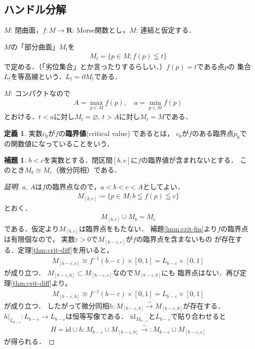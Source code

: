 \documentclass[11pt, a4paper, dvipdfmx]{jsarticle}
\theoremstyle{definition}
\newcommand{\rr}{\mathbf{R}}
\newcommand{\p}{\partial}
\newcommand{\e}{\varepsilon} %
\newcommand{\emp}{\varnothing}
\newcommand{\mapres}[2]{\left. #1 \right|_{#2}}
\newcommand{\id}{\mathrm{id}}
\theoremstyle{mystyle}
\newtheorem{DFN}[Axiom]{定義}
\newtheorem{LMM}[Axiom]{補題}
\numberwithin{equation}{section} %
\begin{document}
\subsection{ハンドル分解}

$M$: 閉曲面，$f\colon M\to\rr$: Morse関数とし，$M$: 連結と仮定する．

$M$の「部分曲面」$M_t$を
\begin{align}
    M_t=\{p\in M; f(p)\leqq t\}
\end{align}
で定める．（「劣位集合」とか言ったりするらしい．）$f(p)=t$である点$p$の
集合$L_t$を等高線という．$L_t=\p M_t$である．

$M$: コンパクトなので
\begin{align*}
    A=\max_{p\in M}f(p),\quad a=\min_{p\in M}f(p)
\end{align*}
とおける．$t<a$に対し$M_t=\emp$, $t>A$に対し$M_t=M$である．

\begin{DFN}
    実数$c_0$が$f$の\textbf{臨界値}(critical value) であるとは，
    $c_0$が$f$のある臨界点$p_0$での関数値になっていることをいう．
\end{DFN}

\begin{LMM}
    $b<c$を実数とする．閉区間$[b,c]$に$f$の臨界値が含まれないとする．
    このとき$M_b\cong M_c$（微分同相）である．
\end{LMM}

\begin{proof}[証明]
    $a$, $A$は$f$の臨界点なので，$a<b<c<A$としてよい．
    \begin{align}
        M_{[b,c]}\coloneqq\{p\in M; b\leqq f(p)\leqq c\}
    \end{align}
    とおく．
    \begin{align}
        M_{[b,c]}\cup M_{b}=M_c
    \end{align}
    である．仮定より$M_{[b,c]}$は臨界点をもたない．
    補題\ref{lmm:crit-fin}より$f$の臨界点は有限個なので，
    実数$\e>0$で$M_{[b-\e,c]}$が$f$の臨界点を含まないもの
    が存在する．定理\ref{thm:crit-diff}を用いると，
    \begin{align*}
        M_{[b-\e,c]}\cong f^{-1}(b-\e)\times[0,1]=L_{b-\e}\times[0,1]
    \end{align*}
    が成り立つ．
    $M_{[b-\e,b]}\subset M_{[b-\e,c]}$なので$M_{[b-\e,b]}$にも
    臨界点はない．再び定理\ref{thm:crit-diff}より，
    \begin{align*}
        M_{[b-\e,b]}\cong f^{-1}(b-\e)\times[0,1]=L_{b-\e}\times[0,1]
    \end{align*}
    が成り立つ．
    したがって微分同相$h\colon M_{[b-\e,b]}\overset{\sim}{\longrightarrow} M_{[b-\e,b]}$が存在する．
    $\mapres{h}{L_{b-\e}}\colon L_{b-\e}\to L_{b-\e}$は恒等写像である．
    $\id_{M_{b-\e}}$と$L_{b-\e}$で貼り合わせると
    \begin{align*}
        H=\id\cup h\colon M_{b-\e}\cup M_{[b-\e,b]}
        \overset{\sim}{\longrightarrow}
        \colon M_{b-\e}\cup M_{[b-\e,c]}
    \end{align*}
    が得られる．
\end{proof}
\end{document}
